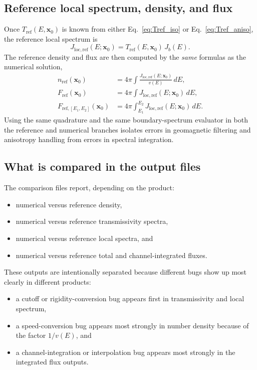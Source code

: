 \documentclass[11pt]{article}
\begin{document}
\subsection{Reference local spectrum, density, and flux}
Once $T_{\mathrm{ref}}(E,\bm{x}_0)$ is known from either
Eq.~\eqref{eq:Tref_iso} or Eq.~\eqref{eq:Tref_aniso}, the reference local
spectrum is
\begin{equation}
  J_{\mathrm{loc,ref}}(E;\bm{x}_0)=T_{\mathrm{ref}}(E,\bm{x}_0)\,J_b(E).
\end{equation}
The reference density and flux are then computed by the \emph{same} formulas as
the numerical solution,
\begin{align}
  n_{\mathrm{ref}}(\bm{x}_0) &= 4\pi\int \frac{J_{\mathrm{loc,ref}}(E;\bm{x}_0)}{v(E)}\,dE, \\
  F_{\mathrm{ref}}(\bm{x}_0) &= 4\pi\int J_{\mathrm{loc,ref}}(E;\bm{x}_0)\,dE, \\
  F_{\mathrm{ref},[E_1,E_2]}(\bm{x}_0) &= 4\pi\int_{E_1}^{E_2} J_{\mathrm{loc,ref}}(E;\bm{x}_0)\,dE.
\end{align}
Using the same quadrature and the same boundary-spectrum evaluator in both the
reference and numerical branches isolates errors in geomagnetic filtering and
anisotropy handling from errors in spectral integration.

\subsection{What is compared in the output files}
The comparison files report, depending on the product:
\begin{itemize}
  \item numerical versus reference density,
  \item numerical versus reference transmissivity spectra,
  \item numerical versus reference local spectra, and
  \item numerical versus reference total and channel-integrated fluxes.
\end{itemize}
These outputs are intentionally separated because different bugs show up most
clearly in different products:
\begin{itemize}
  \item a cutoff or rigidity-conversion bug appears first in transmissivity and
        local spectrum,
  \item a speed-conversion bug appears most strongly in number density because of
        the factor $1/v(E)$, and
  \item a channel-integration or interpolation bug appears most strongly in the
        integrated flux outputs.
\end{itemize}
\end{document}
